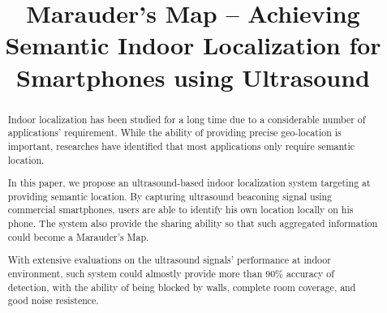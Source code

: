 \documentclass[conference, 10pt]{IEEEtran}
\begin{document}
\title{Marauder's Map -- Achieving Semantic Indoor Localization for Smartphones using Ultrasound}

\author{
\and
{}
\and
{}
}

\maketitle

\begin{abstract}
Indoor localization has been studied for a long time due to a considerable number of applications' requirement. While the ability of providing precise geo-location is important, researches have identified that most applications only require semantic location.

In this paper, we propose an ultrasound-based indoor localization system targeting at providing semantic location. By capturing ultrasound beaconing signal using commercial smartphones, users are able to identify his own location locally on his phone. The system also provide the sharing ability so that such aggregated information could become a Marauder's Map. 

With extensive evaluations on the ultrasound signals' performance at indoor environment, such system could almostly provide more than 90\% accuracy of detection, with the ability of being blocked by walls, complete room coverage, and good noise resistence. 
\end{abstract}








\end{document}

